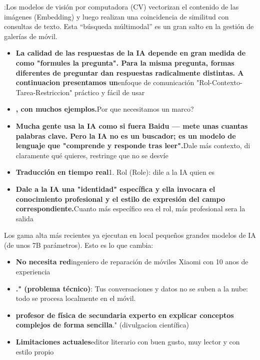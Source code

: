 
:Los modelos de visión por computadora (CV) vectorizan el contenido de las imágenes (Embedding) y luego realizan una coincidencia de similitud con consultas de texto. Esta “búsqueda múltimodal” es un gran salto en la gestión de galerías de móvil.


\begin{itemize}
  \item \textbf{La calidad de las respuestas de la IA depende en gran medida de como "formules la pregunta". Para la misma pregunta, formas diferentes de preguntar dan respuestas radicalmente distintas. A continuacion presentamos un}enfoque de comunicación "Rol-Contexto-Tarea-Restriccion" práctico y fácil de usar
  \item \textbf{, con muchos ejemplos.}Por que necesitamos un marco?
  \item \textbf{Mucha gente usa la IA como si fuera Baidu — mete unas cuantas palabras clave. Pero la IA no es un buscador; es un modelo de lenguaje que "comprende y responde tras leer".}Dale más contexto, di claramente qué quieres, restringe que no se desvíe
  \item \textbf{Traducción en tiempo real}1. Rol (Role): dile a la IA quien es
  \item \textbf{Dale a la IA una "identidad" específica y ella invocara el conocimiento profesional y el estilo de expresión del campo correspondiente.}Cuanto más específico sea el rol, más profesional sera la salida
\end{itemize}


Los gama alta más recientes ya ejecutan en local pequeños grandes modelos de IA (de unos 7B parámetros). Esto es lo que cambia:

\begin{itemize}
  \item \textbf{No necesita red}ingeniero de reparación de móviles Xiaomi con 10 anos de experiencia
  \item \textbf{." (problema técnico)}: Tus conversaciones y datos no se suben a la nube: todo se procesa localmente en el móvil.
  \item \textbf{profesor de física de secundaria experto en explicar conceptos complejos de forma sencilla}." (divulgacion científica)
  \item \textbf{Limitaciones actuales}editor literario con buen gusto, muy lector y con estilo propio
\end{itemize}


